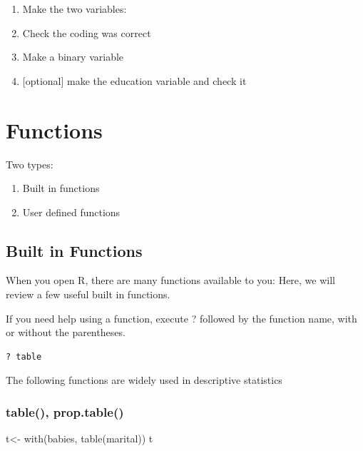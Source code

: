 \documentclass[
]{book}
\newenvironment{Shaded}{\begin{snugshade}}{\end{snugshade}}
\newcommand{\FunctionTok}[1]{\textcolor[rgb]{0.00,0.00,0.00}{#1}}
\newcommand{\NormalTok}[1]{#1}
\newcommand{\OtherTok}[1]{\textcolor[rgb]{0.56,0.35,0.01}{#1}}
\providecommand{\tightlist}{%
  \setlength{\itemsep}{0pt}\setlength{\parskip}{0pt}}
\begin{document}
\begin{enumerate}
\def\labelenumi{\arabic{enumi}.}
\item
  Make the two variables:
\item
  Check the coding was correct
\item
  Make a binary variable
\item
  {[}optional{]} make the education variable and check it
\end{enumerate}

\hypertarget{functions}{%
\section*{Functions}\label{functions}}

Two types:

\begin{enumerate}
\def\labelenumi{\arabic{enumi}.}
\tightlist
\item
  Built in functions
\item
  User defined functions
\end{enumerate}

\hypertarget{built-in-functions}{%
\subsection*{Built in Functions}\label{built-in-functions}}

When you open R, there are many functions available to you: Here, we will review a few useful built in functions.

If you need help using a function, execute ? followed by the function name, with or without the parentheses.

\begin{verbatim}
? table
\end{verbatim}

The following functions are widely used in descriptive statistics

\hypertarget{table-prop.table}{%
\subsubsection*{table(), prop.table()}\label{table-prop.table}}

\begin{Shaded}
\begin{Highlighting}[]
\NormalTok{t}\OtherTok{\textless{}{-}} \FunctionTok{with}\NormalTok{(babies, }\FunctionTok{table}\NormalTok{(marital))}
\NormalTok{t}
\end{Highlighting}
\end{Shaded}
\end{document}
